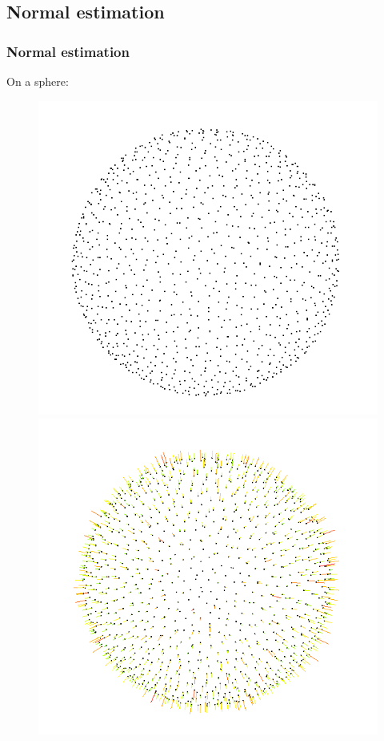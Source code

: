\documentclass{beamer}
\begin{document}
\subsection{Normal estimation}
\begin{frame}
    \frametitle{Normal estimation}

    On a sphere:
    \begin{figure}
        \centering
        \includegraphics[scale=0.15]{img/sphere-1000}
        \includegraphics[scale=0.15]{img/sphere-sphere-1000-05}
    \end{figure}


\end{frame}
\end{document}

